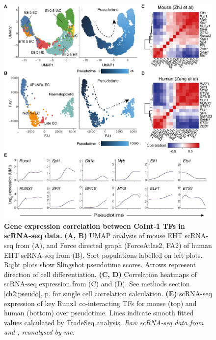 \begin{figure}[!t]
    \centering
    \includegraphics[width=\textwidth,height=\textheight,keepaspectratio]{figures/chapter3/ch3_sc-rna.png}
    \caption[{Gene expression correlation between CoInt-1 TFs in scRNA-seq data.}]
    {\textbf{Gene expression correlation between CoInt-1 TFs in scRNA-seq data.} 
    \textbf{(A, B)} UMAP analysis of mouse EHT scRNA-seq from \cite{zhu_developmental_2020} (A), and Force directed graph (ForceAtlas2, FA2) of human EHT scRNA-seq from \cite{zeng_tracing_2019} (B). Sort populations labelled on left plots. Right plots show Slingshot pseudotime scores. Arrows represent direction of cell differentiation.
    \textbf{(C, D)} Correlation heatmaps of scRNA-seq expression from \cite{zhu_developmental_2020} (C) and \cite{zeng_tracing_2019} (D). See methods section \ref{ch2:pseudo}, p.\pageref{ch2:pseudo} for single cell correlation calculation. 
    \textbf{(E)} scRNA-seq expression of key Runx1 co-interacting TFs for mouse (top) and human (bottom) over pseudotime. Lines indicate smooth fitted values calculated by TradeSeq analysis. 
    \textit{Raw scRNA-seq data from \cite{zhu_developmental_2020} and \cite{zeng_tracing_2019}, reanalysed by me.} 
    }
    \label{fig:ch3_sc-rna}
\end{figure}

